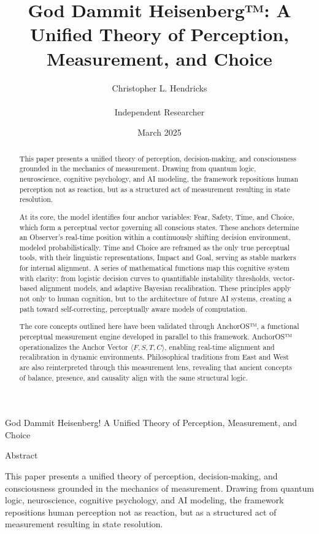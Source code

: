 \documentclass[11pt]{article}
\title{God Dammit Heisenberg™: A Unified Theory of Perception, Measurement, and Choice}
\author{Christopher L. Hendricks \\\\ Independent Researcher}
\date{March 2025}
\begin{document}
\maketitle

\begin{abstract}
This paper presents a unified theory of perception, decision-making, and consciousness grounded in the mechanics of measurement. Drawing from quantum logic, neuroscience, cognitive psychology, and AI modeling, the framework repositions human perception not as reaction, but as a structured act of measurement resulting in state resolution.

At its core, the model identifies four anchor variables: Fear, Safety, Time, and Choice, which form a perceptual vector governing all conscious states. These anchors determine an Observer’s real-time position within a continuously shifting decision environment, modeled probabilistically. Time and Choice are reframed as the only true perceptual tools, with their linguistic representations, Impact and Goal, serving as stable markers for internal alignment. A series of mathematical functions map this cognitive system with clarity: from logistic decision curves to quantifiable instability thresholds, vector-based alignment models, and adaptive Bayesian recalibration. These principles apply not only to human cognition, but to the architecture of future AI systems, creating a path toward self-correcting, perceptually aware models of computation.

The core concepts outlined here have been validated through AnchorOS™, a functional perceptual measurement engine developed in parallel to this framework. AnchorOS™ operationalizes the Anchor Vector $\langle F, S, T, C \rangle$, enabling real-time alignment and recalibration in dynamic environments. Philosophical traditions from East and West are also reinterpreted through this measurement lens, revealing that ancient concepts of balance, presence, and causality align with the same structural logic.

\end{abstract}
God Dammit Heisenberg!
A Unified Theory of Perception, Measurement, and Choice

Abstract

This paper presents a unified theory of perception, decision-making, and consciousness grounded in the mechanics of measurement. Drawing from quantum logic, neuroscience, cognitive psychology, and AI modeling, the framework repositions human perception not as reaction, but as a structured act of measurement resulting in state resolution.
\end{document}
